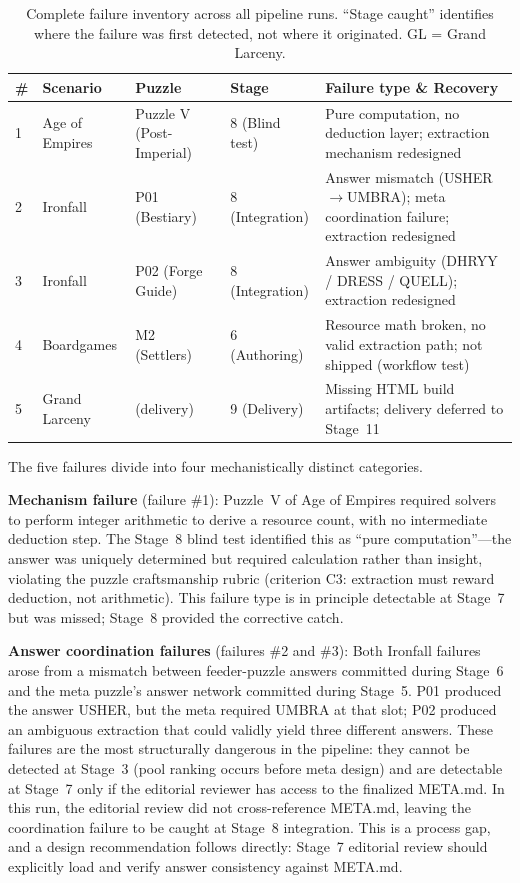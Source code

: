 \begin{table}[htbp]
\centering
\caption{Complete failure inventory across all pipeline runs. ``Stage caught'' identifies where the failure was first detected, not where it originated. GL = Grand Larceny.}
\label{tab:failures}
\begin{tabular}{@{}llllp{4.2cm}@{}}
\toprule
\textbf{\#} & \textbf{Scenario} & \textbf{Puzzle} & \textbf{Stage} & \textbf{Failure type} \& Recovery \\
\midrule
1 & Age of Empires & Puzzle V (Post-Imperial)  & 8 (Blind test)    & Pure computation, no deduction layer; extraction mechanism redesigned \\
2 & Ironfall       & P01 (Bestiary)            & 8 (Integration)   & Answer mismatch (USHER$\to$UMBRA); meta coordination failure; extraction redesigned \\
3 & Ironfall       & P02 (Forge Guide)         & 8 (Integration)   & Answer ambiguity (DHRYY / DRESS / QUELL); extraction redesigned \\
4 & Boardgames     & M2 (Settlers)             & 6 (Authoring)     & Resource math broken, no valid extraction path; not shipped (workflow test) \\
5 & Grand Larceny  & (delivery)                & 9 (Delivery)      & Missing HTML build artifacts; delivery deferred to Stage~11 \\
\bottomrule
\end{tabular}
\end{table}

The five failures divide into four mechanistically distinct categories.

\textbf{Mechanism failure} (failure \#1): Puzzle~V of Age of Empires required solvers to perform integer arithmetic to derive a resource count, with no intermediate deduction step. The Stage~8 blind test identified this as ``pure computation''---the answer was uniquely determined but required calculation rather than insight, violating the puzzle craftsmanship rubric (criterion C3: extraction must reward deduction, not arithmetic). This failure type is in principle detectable at Stage~7 but was missed; Stage~8 provided the corrective catch.

\textbf{Answer coordination failures} (failures \#2 and \#3): Both Ironfall failures arose from a mismatch between feeder-puzzle answers committed during Stage~6 and the meta puzzle's answer network committed during Stage~5. P01 produced the answer USHER, but the meta required UMBRA at that slot; P02 produced an ambiguous extraction that could validly yield three different answers. These failures are the most structurally dangerous in the pipeline: they cannot be detected at Stage~3 (pool ranking occurs before meta design) and are detectable at Stage~7 only if the editorial reviewer has access to the finalized META.md. In this run, the editorial review did not cross-reference META.md, leaving the coordination failure to be caught at Stage~8 integration. This is a process gap, and a design recommendation follows directly: Stage~7 editorial review should explicitly load and verify answer consistency against META.md.

